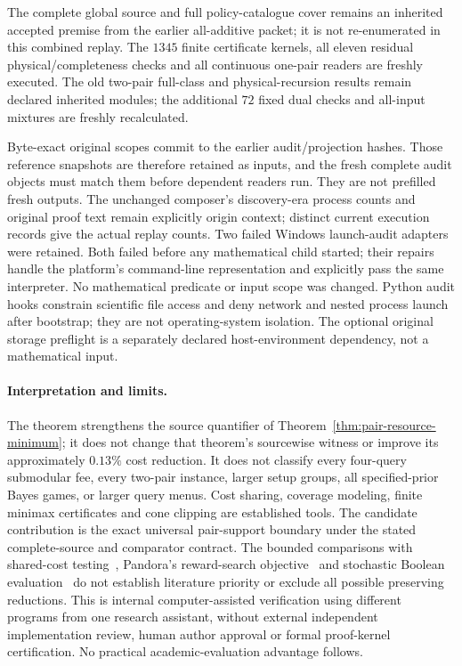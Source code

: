 The complete global source and full policy-catalogue cover remains
an inherited accepted premise from the earlier all-additive packet;
it is not re-enumerated in this combined replay. The $1345$ finite
certificate kernels, all eleven residual physical/completeness
checks and all continuous one-pair readers are freshly executed.
The old two-pair full-class and physical-recursion results remain
declared inherited modules; the additional $72$ fixed dual checks
and all-input mixtures are freshly recalculated.

Byte-exact original scopes commit to the earlier audit/projection
hashes. Those reference snapshots are therefore retained as inputs,
and the fresh complete audit objects must match them before dependent
readers run. They are not prefilled fresh outputs. The unchanged
composer's discovery-era process counts and original proof text
remain explicitly origin context; distinct current execution records
give the actual replay counts. Two failed Windows launch-audit
adapters were retained. Both failed before any mathematical child
started; their repairs handle the platform's command-line
representation and explicitly pass the same interpreter. No
mathematical predicate or input scope was changed. Python audit hooks
constrain scientific file access and deny network and nested process
launch after bootstrap; they are not operating-system isolation.
The optional original storage preflight is a separately declared
host-environment dependency, not a mathematical input.

\paragraph*{Interpretation and limits.}
The theorem strengthens the source quantifier of
Theorem~\ref{thm:pair-resource-minimum}; it does not change that
theorem's sourcewise witness or improve its approximately $0.13\%$
cost reduction. It does not classify every four-query submodular
fee, every two-pair instance, larger setup groups, all specified-prior
Bayes games, or larger query menus. Cost sharing, coverage modeling,
finite minimax certificates and cone clipping are established tools.
The candidate contribution is the exact universal pair-support
boundary under the stated complete-source and comparator contract.
The bounded comparisons with shared-cost testing~\cite{harris2025},
Pandora's reward-search objective~\cite{pandora} and stochastic
Boolean evaluation~\cite{hellerstein2022adaptivity} do not establish
literature priority or exclude all possible preserving reductions.
This is internal computer-assisted verification using different
programs from one research assistant, without external independent
implementation review, human author approval or formal proof-kernel
certification. No practical academic-evaluation advantage follows.
